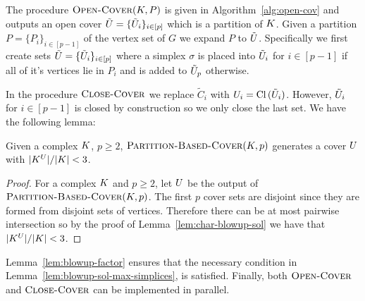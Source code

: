The procedure $\textnormal{\scshape Open-Cover}(K,P)$ is given in Algorithm~\ref{alg:open-cov} and outputs an open cover $\tilde{U} = \{\tilde{U}_i\}_{i \in [p]}$ which is a partition of $K$. Given a partition $P = \{P_i\}_{i \in [p-1]}$ of the vertex set of $G$ we expand $P$ to $\tilde{U}$. Specifically we first create sets 
$\tilde{U} = \{\tilde{U}_i\}_{i \in [p]}$ where a simplex $\sigma$ is placed into $\tilde{U}_i$ for $i \in [p-1]$ 
if all of it's vertices lie in $P_i$ and is added to $\tilde{U}_p$ otherwise. 

In the procedure $\textnormal{\scshape Close-Cover}$ we replace $\tilde{C}_{i}$ with $U_i = \operatorname{Cl}{(\tilde{U}_i)}$. However, $\tilde{U}_i$ for $i \in [p-1]$ is closed by construction so we only close the last set.  We have the following lemma: 
\begin{lemma}
\label{lem:blowup-factor}
Given a complex $K$, $p \geq 2$, $\textnormal{\scshape Partition-Based-Cover}(K, p)$ 
generates a cover $U$ with $|K^{U}|/|K| < 3$. 
\end{lemma}
\begin{proof}
For a complex $K$ and $p \geq 2$, let $U$ be the output of 
$\textnormal{\scshape Partition-Based-Cover}(K,p)$. The first
$p$ cover sets are disjoint since they are formed from disjoint sets of vertices.
Therefore there can be at most pairwise intersection so by the proof of Lemma~\ref{lem:char-blowup-sol} we have that $|K^{U}|/|K| < 3$.
\end{proof}
Lemma~\ref{lem:blowup-factor} ensures that the necessary condition in Lemma~\ref{lem:blowup-sol-max-simplices}, is 
satisfied. Finally, both $\textnormal{\scshape Open-Cover}$ and $\textnormal{\scshape Close-Cover}$ can be implemented in parallel. 
